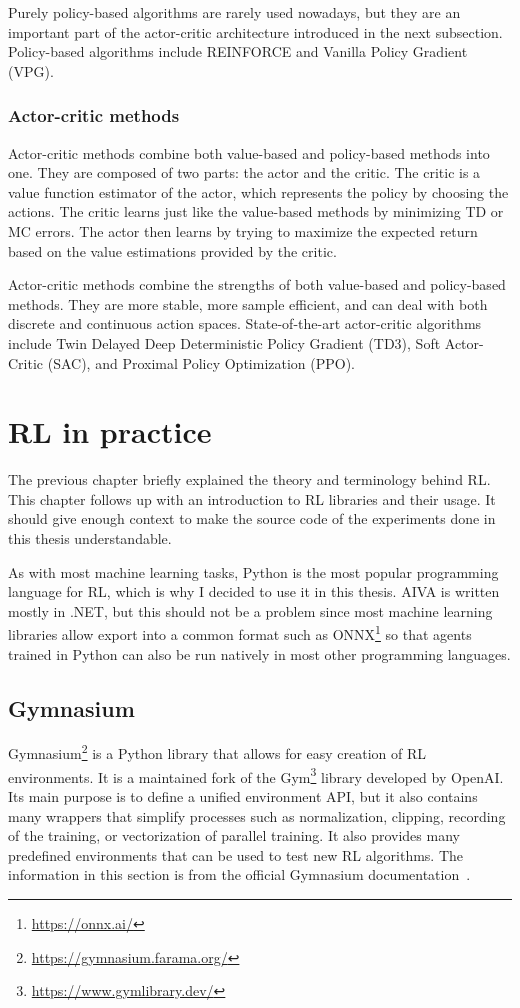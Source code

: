 \documentclass[
  digital,     %
  oneside,     %
  nosansbold,  %
  nocolorbold, %
  lof,         %
  lot,         %
]{fithesis4}
\begin{document}
Purely policy-based algorithms are rarely used nowadays, but they are an important part of the actor-critic architecture introduced in the next subsection. Policy-based algorithms include REINFORCE and Vanilla Policy Gradient (VPG).

\subsection{Actor-critic methods}

Actor-critic methods combine both value-based and policy-based methods into one. They are composed of two parts: the actor and the critic. The critic is a value function estimator of the actor, which represents the policy by choosing the actions. The critic learns just like the value-based methods by minimizing TD or MC errors. The actor then learns by trying to maximize the expected return based on the value estimations provided by the critic.

Actor-critic methods combine the strengths of both value-based and policy-based methods. They are more stable, more sample efficient, and can deal with both discrete and continuous action spaces. State-of-the-art actor-critic algorithms include Twin Delayed Deep Deterministic Policy Gradient (TD3), Soft Actor-Critic (SAC), and Proximal Policy Optimization (PPO).

\chapter{RL in practice}

The previous chapter briefly explained the theory and terminology behind RL. This chapter follows up with an introduction to RL libraries and their usage. It should give enough context to make the source code of the experiments done in this thesis understandable.

As with most machine learning tasks, Python is the most popular programming language for RL, which is why I decided to use it in this thesis. AIVA is written mostly in .NET, but this should not be a problem since most machine learning libraries allow export into a common format such as ONNX\footnote{\url{https://onnx.ai/}} so that agents trained in Python can also be run natively in most other programming languages.

\section{Gymnasium}
\label{sec:gym}
Gymnasium\footnote{\url{https://gymnasium.farama.org/}} is a Python library that allows for easy creation of RL environments. It is a maintained fork of the Gym\footnote{\url{https://www.gymlibrary.dev/}} library developed by OpenAI. Its main purpose is to define a unified environment API, but it also contains many wrappers that simplify processes such as normalization, clipping, recording of the training, or vectorization of parallel training. It also provides many predefined environments that can be used to test new RL algorithms. The information in this section is from the official Gymnasium documentation~\cite{gym-docs}.
\end{document}
